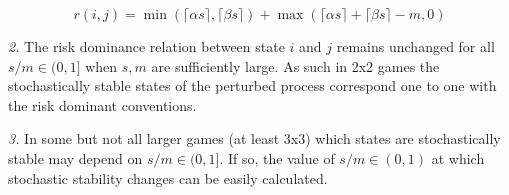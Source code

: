 \documentclass{article}
\begin{document}
$$r(i,j)=\min(\lceil \alpha s \rceil,\lceil \beta s \rceil)+\max(\lceil \alpha s \rceil+\lceil \beta s \rceil-m,0)$$

\textit{2.} The risk dominance relation between state $i$ and $j$ remains unchanged for all $s/m \in (0,1]$ when $s,m$ are sufficiently large. As such in 2x2 games the stochastically stable states of the perturbed process correspond one to one with the risk dominant conventions.

\textit{3.} In some but not all larger games (at least 3x3) which states are stochastically stable may depend on $s/m \in (0,1]$. If so, the value of $s/m \in (0,1)$ at which stochastic stability changes can be easily calculated.




\end{document}
